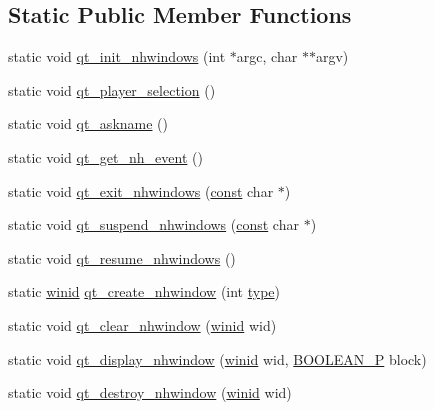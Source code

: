 \subsection*{Static Public Member Functions}
\begin{DoxyCompactItemize}
\item 
static void \hyperlink{classNetHackQtBind_a50dfb0afbb49e0f4e62bf11aead6095c}{qt\+\_\+init\+\_\+nhwindows} (int $\ast$argc, char $\ast$$\ast$argv)
\item 
static void \hyperlink{classNetHackQtBind_ab5658e11fba437f53e32c199b48ee69f}{qt\+\_\+player\+\_\+selection} ()
\item 
static void \hyperlink{classNetHackQtBind_a8d649d2cf9070f1e1ce3acd04d9cbf4f}{qt\+\_\+askname} ()
\item 
static void \hyperlink{classNetHackQtBind_a368d065db08bc8cb5fcbebe97a71f4f3}{qt\+\_\+get\+\_\+nh\+\_\+event} ()
\item 
static void \hyperlink{classNetHackQtBind_a35b06171166bf5556eac7b3ee48a4f67}{qt\+\_\+exit\+\_\+nhwindows} (\hyperlink{tradstdc_8h_a2c212835823e3c54a8ab6d95c652660e}{const} char $\ast$)
\item 
static void \hyperlink{classNetHackQtBind_a7a3430a5aff74794b98efd4d2a2308f9}{qt\+\_\+suspend\+\_\+nhwindows} (\hyperlink{tradstdc_8h_a2c212835823e3c54a8ab6d95c652660e}{const} char $\ast$)
\item 
static void \hyperlink{classNetHackQtBind_a14cf02a38f7cb87537db921617e0aa94}{qt\+\_\+resume\+\_\+nhwindows} ()
\item 
static \hyperlink{wintype_8h_adc2de956a3f084b1691cf080e1d1412b}{winid} \hyperlink{classNetHackQtBind_a22c0d56b1777106e6324dfa09028a816}{qt\+\_\+create\+\_\+nhwindow} (int \hyperlink{lev__main_8c_ac765329451135abec74c45e1897abf26}{type})
\item 
static void \hyperlink{classNetHackQtBind_a08b0415f09f6897d1a1345125fcb4715}{qt\+\_\+clear\+\_\+nhwindow} (\hyperlink{wintype_8h_adc2de956a3f084b1691cf080e1d1412b}{winid} wid)
\item 
static void \hyperlink{classNetHackQtBind_a74d98771f6b0d8e383a4a3402940771b}{qt\+\_\+display\+\_\+nhwindow} (\hyperlink{wintype_8h_adc2de956a3f084b1691cf080e1d1412b}{winid} wid, \hyperlink{wingem1_8c_aa2723cc3af18a5199ab4ce7cca84d82b}{B\+O\+O\+L\+E\+A\+N\+\_\+\+P} block)
\item 
static void \hyperlink{classNetHackQtBind_a13fe1b1f878d0cce0e141ff3bc6c6392}{qt\+\_\+destroy\+\_\+nhwindow} (\hyperlink{wintype_8h_adc2de956a3f084b1691cf080e1d1412b}{winid} wid)
$$
\end{DoxyCompactItemize}
